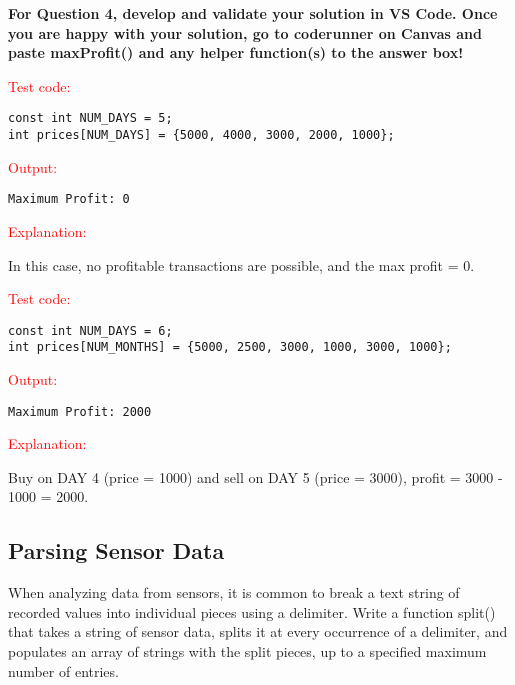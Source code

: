 \textbf{For Question 4, develop and validate your solution in VS Code. Once you are happy with your solution, go to coderunner on Canvas and paste maxProfit() and any helper function(s) to the answer box!}  
\begin{sample}
\textcolor{red}{Test code:}
\begin{verbatim}
const int NUM_DAYS = 5;
int prices[NUM_DAYS] = {5000, 4000, 3000, 2000, 1000};
\end{verbatim}
\textcolor{red}{Output:}
\begin{verbatim}
Maximum Profit: 0
\end{verbatim}
\textcolor{red}{Explanation:} 

In this case, no profitable transactions are possible, and the max profit = 0.
\end{sample}


\begin{sample}
\textcolor{red}{Test code:}
\begin{verbatim}
const int NUM_DAYS = 6;
int prices[NUM_MONTHS] = {5000, 2500, 3000, 1000, 3000, 1000};
\end{verbatim}
\textcolor{red}{Output:}
\begin{verbatim}
Maximum Profit: 2000
\end{verbatim}
\textcolor{red}{Explanation:} 

Buy on DAY 4 (price = 1000) and sell on DAY 5 (price = 3000), profit = 3000 - 1000 = 2000.
\end{sample}



\subsection{Parsing Sensor Data}

When analyzing data from sensors, it is common to break a text string of recorded values into individual pieces using a delimiter. Write a function split() that takes a string of sensor data, splits it at every occurrence of a delimiter, and populates an array of strings with the split pieces, up to a specified maximum number of entries.


